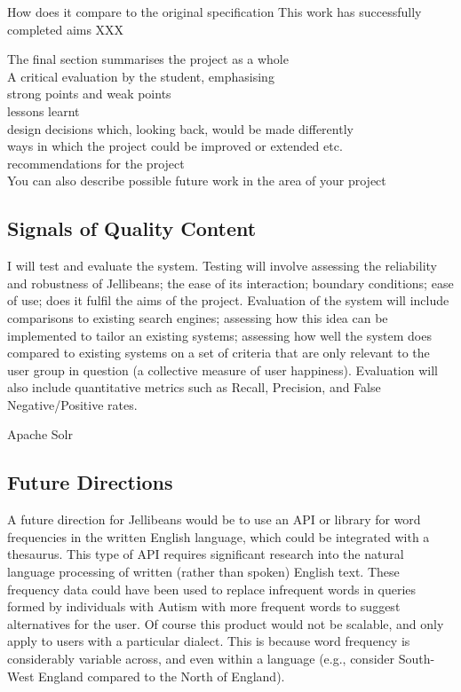 \documentclass[a4paper, 11pt]{article}
\begin{document}
How does it compare to the original specification
This work has successfully completed aims XXX

The final section summarises the project as a whole\\
A critical evaluation by the student, emphasising\\
strong points and weak points\\
lessons learnt\\
design decisions which, looking back, would be made differently\\
ways in which the project could be improved or extended etc.\\
recommendations for the project\\
You can also describe possible future work in the area of your project

\subsection{Signals of Quality Content}
I will test and evaluate the system. Testing will involve assessing the reliability and robustness of Jellibeans; the ease of its interaction; boundary conditions; ease of use; does it fulfil the aims of the project.
Evaluation of the system will include comparisons to existing search engines; assessing how this idea can be implemented to tailor an existing systems; assessing how well the system does compared to existing systems on a set of criteria that are only relevant to the user group in question (a collective measure of user happiness). Evaluation will also include quantitative metrics such as Recall, Precision, and False Negative/Positive rates.


Apache Solr\\


\subsection{Future Directions}
A future direction for Jellibeans would be to use an API or library for word frequencies in the written English language, which could be integrated with a thesaurus. This type of API requires significant research into the natural language processing of written (rather than spoken) English text. These frequency data could have been used to replace infrequent words in queries formed by individuals with Autism with more frequent words to suggest alternatives for the user. Of course this product would not be scalable, and only apply to users with a particular dialect. This is because word frequency is considerably variable across, and even within a language (e.g., consider South-West England compared to the North of England).
\end{document}
